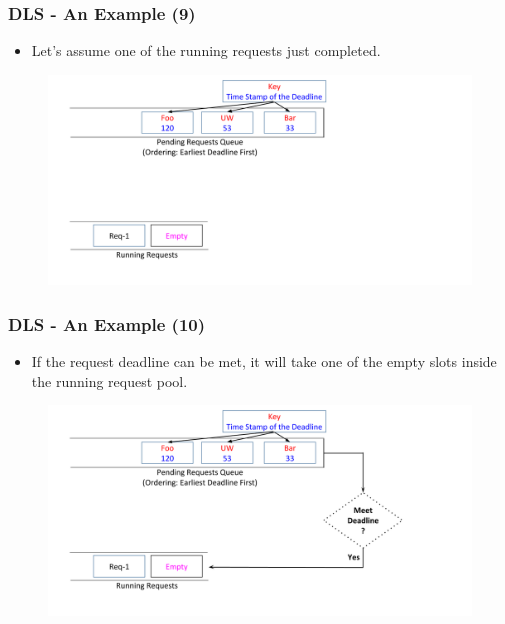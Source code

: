\documentclass{beamer}
\begin{document}
\begin{frame}
  \frametitle{DLS - An Example (9)}
  \begin{itemize}
  \item Let's assume one of the running requests just completed.
    \newline
    \newline
  \end{itemize}
  \begin{figure}
    \begin{center}
      \centerline{\includegraphics[scale=0.33]{img/DLS_Example8_3.png}}
    \end{center}
  \end{figure}
\end{frame}


\begin{frame}
  \frametitle{DLS - An Example (10)}
  \begin{itemize}
  \item If the request deadline can be met, it will take one of the empty slots
    inside the running request pool.
    \newline
  \end{itemize}
  \begin{figure}
    \begin{center}
      \centerline{\includegraphics[scale=0.33]{img/DLS_Example8_4.png}}
    \end{center}
  \end{figure}
\end{frame}
\end{document}
